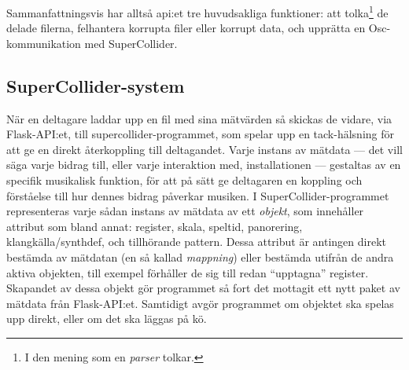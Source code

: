 \documentclass[11pt, a4paper]{article} %
\begin{document}
Sammanfattningsvis har alltså \gls{api}:et tre huvudsakliga funktioner: att tolka\footnote{I den mening som en \emph{parser} tolkar.} de delade filerna, felhantera korrupta filer eller korrupt data, och upprätta en Osc-kommunikation med SuperCollider.


\subsection*{SuperCollider-system}
När en deltagare laddar upp en fil med sina mätvärden så skickas de vidare, via Flask-API:et, till \gls{supercollider}-programmet, som spelar upp en tack-hälsning för att ge en direkt återkoppling till deltagandet. Varje instans av mätdata --- det vill säga varje bidrag till, eller varje interaktion med, installationen --- gestaltas av en specifik musikalisk funktion, för att på sätt ge deltagaren en koppling och förståelse till hur dennes bidrag påverkar musiken. 
I SuperCollider-programmet representeras varje sådan instans av mätdata av ett \emph{objekt}, som innehåller attribut som bland annat: register, skala, speltid, panorering, klangkälla/\gls{synthdef}, och tillhörande {\gls{pattern}}. Dessa attribut är antingen direkt bestämda av mätdatan (en så kallad \emph{mappning}) eller bestämda utifrån de andra aktiva objekten, till exempel förhåller de sig till redan ``upptagna'' register. Skapandet av dessa objekt gör programmet så fort det mottagit ett nytt paket av mätdata från Flask-API:et. Samtidigt avgör programmet om objektet ska spelas upp direkt, eller om det ska läggas på kö. 
\end{document}
